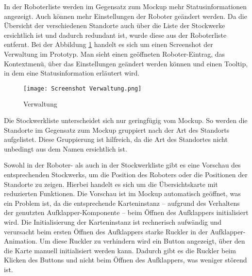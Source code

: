 In der Roboterliste werden im Gegensatz zum \gls{Mockup} mehr Statusinformationen angezeigt. Auch können mehr Einstellungen der Roboter geändert werden. Da die Übersicht der verschiedenen Standorte auch über die Liste der Stockwerke ersichtlich ist und dadurch redundant ist, wurde diese aus der Roboterliste entfernt. Bei der Abbildung \ref{fig:RobotlistScreenshot} handelt es sich um einen Screenshot der Verwaltung im Prototyp. Man sieht einen geöffneten Roboter-Eintrag, das Kontextmenü, über das Einstellungen geändert werden können und einen Tooltip, in dem eine Statusinformation erläutert wird.

\begin{figure}[H]
    \caption{Verwaltung}\label{fig:RobotlistScreenshot}
    \texttt{[image: Screenshot Verwaltung.png]}
\end{figure}

Die Stockwerkliste unterscheidet sich nur geringfügig vom \gls{Mockup}. So werden die Standorte im Gegensatz zum \gls{Mockup} gruppiert nach der Art des Standorts aufgelistet. Diese Gruppierung ist hilfreich, da die Art des Standortes nicht unbedingt aus dem Namen ersichtlich ist.

Sowohl in der Roboter- als auch in der Stockwerkliste gibt es eine Vorschau des entsprechenden Stockwerks, um die Position des Roboters oder die Positionen der Standorte zu zeigen. Hierbei handelt es sich um die Übersichtskarte mit reduzierten Funktionen. Die Vorschau ist im \gls{Mockup} automatisch geöffnet, was ein Problem ist, da die entsprechende \deckgl{} Karteninstanz – aufgrund des Verhaltens der genutzten Aufklapper-Komponente – beim Öffnen des Aufklappers initialisiert wird. Die Initialisierung der Karteninstanz ist rechnerisch aufwändig und verursacht beim ersten Öffnen des Aufklappers starke Ruckler in der Aufklapper-Animation. Um diese Ruckler zu verhindern wird ein Button angezeigt, über den die Karte manuell initialisiert werden kann. Dadurch gibt es die Ruckler beim Klicken des Buttons und nicht beim Öffnen des Aufklappers, was weniger störend ist.

